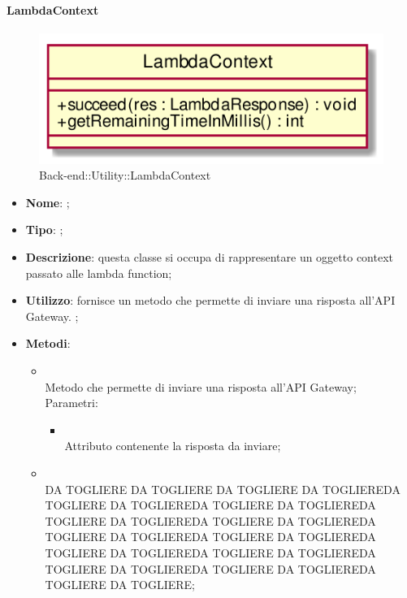 \hypertarget{LambdaContext_label}{\paragraph{LambdaContext}}
\begin{figure}[h]
	\centering
	\includegraphics[width=\textwidth,height=\textheight,keepaspectratio]{images/ClassLambdaContext.png}
	\caption{Back-end::Utility::LambdaContext}
\end{figure}
\begin{itemize}
	\item \textbf{Nome}: ;
	\item \textbf{Tipo}: ;
	\item \textbf{Descrizione}: questa classe si occupa di rappresentare un oggetto context passato alle lambda function;
	\item \textbf{Utilizzo}: fornisce un metodo che permette di inviare una risposta all'API Gateway. ;
	\item \textbf{Metodi}:
	\begin{itemize}
		\item[]  \\
		Metodo che permette di inviare una risposta all'API Gateway;\\
		Parametri:
		\begin{itemize}
			\item {} \\
			Attributo contenente la risposta da inviare;
		\end{itemize}
		\item[]  \\
		DA TOGLIERE DA TOGLIERE DA TOGLIERE DA TOGLIEREDA TOGLIERE DA TOGLIEREDA TOGLIERE DA TOGLIEREDA TOGLIERE DA TOGLIEREDA TOGLIERE DA TOGLIEREDA TOGLIERE DA TOGLIEREDA TOGLIERE DA TOGLIEREDA TOGLIERE DA TOGLIEREDA TOGLIERE DA TOGLIEREDA TOGLIERE DA TOGLIEREDA TOGLIERE DA TOGLIEREDA TOGLIERE DA TOGLIERE;\\
	\end{itemize}
\end{itemize}
\FloatBarrier

